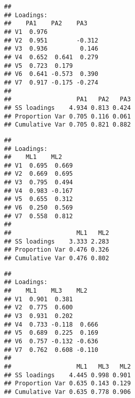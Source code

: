 \documentclass[
]{article}
\newenvironment{Shaded}{\begin{snugshade}}{\end{snugshade}}
\newcommand{\CommentTok}[1]{\textcolor[rgb]{0.56,0.35,0.01}{\textit{#1}}}
\newcommand{\DataTypeTok}[1]{\textcolor[rgb]{0.13,0.29,0.53}{#1}}
\newcommand{\DecValTok}[1]{\textcolor[rgb]{0.00,0.00,0.81}{#1}}
\newcommand{\KeywordTok}[1]{\textcolor[rgb]{0.13,0.29,0.53}{\textbf{#1}}}
\newcommand{\NormalTok}[1]{#1}
\newcommand{\OperatorTok}[1]{\textcolor[rgb]{0.81,0.36,0.00}{\textbf{#1}}}
\newcommand{\StringTok}[1]{\textcolor[rgb]{0.31,0.60,0.02}{#1}}
\begin{document}
\begin{Shaded}
\end{Shaded}

\begin{verbatim}
## 
## Loadings:
##    PA1    PA2    PA3   
## V1  0.976              
## V2  0.951        -0.312
## V3  0.936         0.146
## V4  0.652  0.641  0.279
## V5  0.723  0.179       
## V6  0.641 -0.573  0.390
## V7  0.917 -0.175 -0.274
## 
##                  PA1   PA2   PA3
## SS loadings    4.934 0.813 0.424
## Proportion Var 0.705 0.116 0.061
## Cumulative Var 0.705 0.821 0.882
\end{verbatim}

\begin{Shaded}
\end{Shaded}

\begin{verbatim}
## 
## Loadings:
##    ML1    ML2   
## V1  0.695  0.669
## V2  0.669  0.695
## V3  0.795  0.494
## V4  0.983 -0.167
## V5  0.655  0.312
## V6  0.250  0.569
## V7  0.558  0.812
## 
##                  ML1   ML2
## SS loadings    3.333 2.283
## Proportion Var 0.476 0.326
## Cumulative Var 0.476 0.802
\end{verbatim}

\begin{Shaded}
\end{Shaded}

\begin{verbatim}
## 
## Loadings:
##    ML1    ML3    ML2   
## V1  0.901  0.381       
## V2  0.775  0.600       
## V3  0.931  0.202       
## V4  0.733 -0.118  0.666
## V5  0.689  0.225  0.169
## V6  0.757 -0.132 -0.636
## V7  0.762  0.608 -0.110
## 
##                  ML1   ML3   ML2
## SS loadings    4.445 0.998 0.901
## Proportion Var 0.635 0.143 0.129
## Cumulative Var 0.635 0.778 0.906
\end{verbatim}
\end{document}
